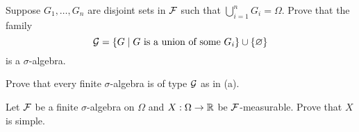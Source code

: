 \begin{exercise}{2.7}$ $\vspace{-1.5em}
    \begin{thmenum}
        \item Suppose $G_1,\ldots,G_n$ are disjoint sets in $\mathcal{F}$ such that $\bigcup_{i=1}^n G_i = \Omega$.
        Prove that the family 
        \begin{equation*}
            \mathcal{G} = \left\{ G \;\middle\vert\; \text{$G$ is a union of some $G_i$} \right\}\cup\left\{ {\varnothing} \right\}
        \end{equation*}
        is a $\sigma$-algebra.
        \item Prove that every finite $\sigma$-algebra is of type $\mathcal{G}$ as in (a).
        \item Let $\mathcal{F}$ be a finite $\sigma$-algebra on $\Omega$ and $X:\Omega\to\mathbb{R}$ 
        be $\mathcal{F}$-measurable. Prove that $X$ is simple. 
    \end{thmenum}
\end{exercise}
